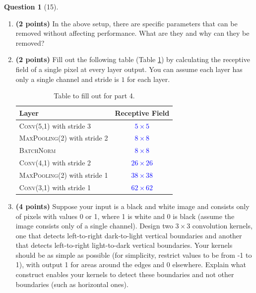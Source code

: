 \documentclass[12pt]{article}
\newif\ifsolution
\theoremstyle{definition}
\newtheorem{exercise}{Question}%
\newtheorem{answer}{Answer} %
\newcommand{\Answer}[1]{
\ifsolution\color{answer}\begin{answer}#1\end{answer}\fi
}
\newif\ifsolution
\begin{document}
\begin{exercise}[15]
{\begin{enumerate}
\item \textbf{(2 points)} In the above setup, there are specific parameters that can be removed without affecting performance. What are they and why can they be removed?

\item \textbf{(2 points)} Fill out the following table (Table \ref{tab:receptive-field-table}) by calculating the receptive field of a single pixel at every layer output. You can assume each layer has only a single channel and stride is $1$ for each layer.

\begin{table}[h]
    \centering
    \begin{tabular}{l|c}
    \toprule
    Layer & Receptive Field \\
    \midrule
    \textsc{Conv(5,1)} with stride 3 & \textcolor{blue}{$5\times5$} \\
    \textsc{MaxPooling(2)} with stride 2 & \textcolor{blue}{$8\times8$} \\
    \textsc{BatchNorm} & \textcolor{blue}{$8\times8$} \\
    \textsc{Conv(4,1)} with stride 2 & \textcolor{blue}{$26\times26$} \\
    \textsc{MaxPooling(2)} with stride 1 & \textcolor{blue}{$38\times38$} \\
    \textsc{Conv(3,1)} with stride 1 & \textcolor{blue}{$62\times62$} \\
    \bottomrule
    \end{tabular}
    \caption{Table to fill out for part 4.}
    \label{tab:receptive-field-table}
\end{table}

\item \textbf{(4 points)} Suppose your input is a black and white image and consists only of pixels with values 0 or 1, where 1 is white and 0 is black (assume the image consists only of a single channel). Design two $3\times 3$ convolution kernels, one that detects left-to-right dark-to-light vertical boundaries and another that detects left-to-right light-to-dark vertical boundaries. Your kernels should be as simple as possible (for simplicity, restrict values to be from -1 to 1), with output 1 for areas around the edges and 0 elsewhere. Explain what construct enables your kernels to detect these boundaries and not other boundaries (such as horizontal ones).
\end{enumerate}
}

\Answer{
\leavevmode\par
\begin{enumerate}
\item \textbf{Equivalent convolution.}
With valid (no-padding) layers and unflipped CNN kernels, the linear/affine
operations fuse into a \textbf{$12\times12$ convolution with stride $12$}.


\end{enumerate}}
\end{exercise}
\end{document}
